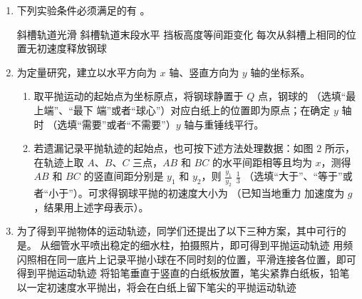 \begin{enumerate}
\begin{enumerate}
\renewcommand{\labelenumi}{\arabic{enumi}.}
\item
下列实验条件必须满足的有  。

\fourchoices
{斜槽轨道光滑}
{斜槽轨道末段水平}
{挡板高度等间距变化}
{每次从斜槽上相同的位置无初速度释放钢球}

\item 
为定量研究，建立以水平方向为 $ x $ 轴、竖直方向为 $ y $ 轴的坐标系。
\begin{enumerate}
\renewcommand{\labelenumiii}{\alph{enumiii}.}
\item
取平抛运动的起始点为坐标原点，将钢球静置于 $ Q $ 点，钢球的  （选填“最上端”、“最下
端”或者“球心”）对应白纸上的位置即为原点；在确定 $ y $ 轴时  （选填“需要”或者“不需要”）$ y $
轴与重锤线平行。

\item 
若遗漏记录平抛轨迹的起始点，也可按下述方法处理数据：如图 $ 2 $ 所示，在轨迹上取 $ A $、$ B $、$ C $
三点，$ AB $ 和 $ BC $ 的水平间距相等且均为 $ x $，测得 $ AB $ 和 $ BC $ 的竖直间距分别是 $ y_{1} $ 和 $ y_{2} $，则 $\frac{y_{1}}{y_{2}}$  $ \frac{ 1 }{ 3 } $ 
（选填“大于”、“等于”或者“小于”）。可求得钢球平抛的初速度大小为  （已知当地重力
加速度为 $ g $，结果用上述字母表示）。
\begin{figure}[h!]
\centering

\end{figure}




\end{enumerate}


\newpage
\item 
为了得到平抛物体的运动轨迹，同学们还提出了以下三种方案，其中可行的是。
\threechoices
{从细管水平喷出稳定的细水柱，拍摄照片，即可得到平抛运动轨迹}
{用频闪照相在同一底片上记录平抛小球在不同时刻的位置，平滑连接各位置，即可得到平抛运动轨迹}
{将铅笔垂直于竖直的白纸板放置，笔尖紧靠白纸板，铅笔以一定初速度水平抛出，将会在白纸上留下笔尖的平抛运动轨迹}


\end{enumerate}
\end{enumerate}
